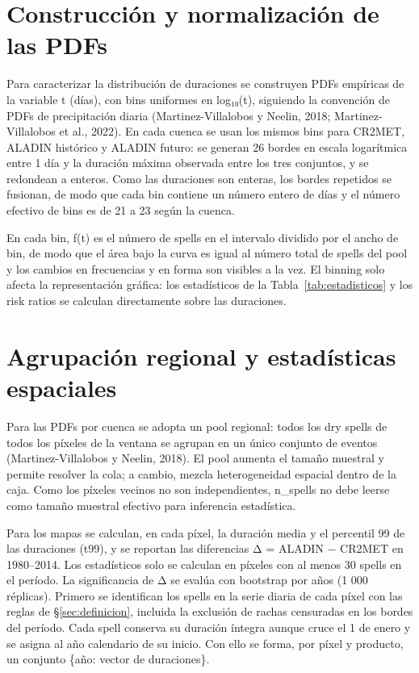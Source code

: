 \section{Construcción y normalización de las PDFs}\label{sec:pdfs}

Para caracterizar la distribución de duraciones se construyen PDFs empíricas de la variable t (días), con bins uniformes en log₁₀(t), siguiendo la convención de PDFs de precipitación diaria (Martinez-Villalobos y Neelin, 2018; Martinez-Villalobos et al., 2022). En cada cuenca se usan los mismos bins para CR2MET, ALADIN histórico y ALADIN futuro: se generan 26 bordes en escala logarítmica entre 1 día y la duración máxima observada entre los tres conjuntos, y se redondean a enteros. Como las duraciones son enteras, los bordes repetidos se fusionan, de modo que cada bin contiene un número entero de días y el número efectivo de bins es de 21 a 23 según la cuenca.

En cada bin, f(t) es el número de spells en el intervalo dividido por el ancho de bin, de modo que el área bajo la curva es igual al número total de spells del pool y los cambios en frecuencias y en forma son visibles a la vez. El binning solo afecta la representación gráfica: los estadísticos de la Tabla~\ref{tab:estadisticos} y los risk ratios se calculan directamente sobre las duraciones.

\section{Agrupación regional y estadísticas espaciales}\label{sec:pool}

Para las PDFs por cuenca se adopta un pool regional: todos los dry spells de todos los píxeles de la ventana se agrupan en un único conjunto de eventos (Martinez-Villalobos y Neelin, 2018). El pool aumenta el tamaño muestral y permite resolver la cola; a cambio, mezcla heterogeneidad espacial dentro de la caja. Como los píxeles vecinos no son independientes, n\_spells no debe leerse como tamaño muestral efectivo para inferencia estadística.

Para los mapas se calculan, en cada píxel, la duración media y el percentil 99 de las duraciones (t99), y se reportan las diferencias Δ = ALADIN − CR2MET en 1980--2014. Los estadísticos solo se calculan en píxeles con al menos 30 spells en el período. La significancia de Δ se evalúa con bootstrap por años (1 000 réplicas). Primero se identifican los spells en la serie diaria de cada píxel con las reglas de §\ref{sec:definicion}, incluida la exclusión de rachas censuradas en los bordes del período. Cada spell conserva su duración íntegra aunque cruce el 1 de enero y se asigna al año calendario de su inicio. Con ello se forma, por píxel y producto, un conjunto \{año: vector de duraciones\}.

